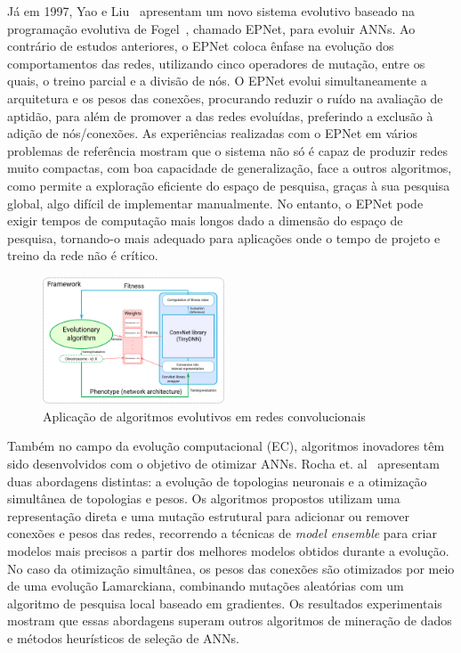 \documentclass[conference]{IEEEtran}
\begin{document}
Já em 1997, Yao e Liu~\cite{Yao1997ANetworks} apresentam um novo sistema evolutivo baseado na programação evolutiva de Fogel~\cite{Fogel1990EvolvingNetworks}, chamado EPNet, para evoluir ANNs. Ao contrário de estudos anteriores, o EPNet coloca ênfase na evolução dos comportamentos das redes, utilizando cinco operadores de mutação, entre os quais, o treino parcial e a divisão de nós. O EPNet evolui simultaneamente a arquitetura e os pesos das conexões, procurando reduzir o ruído na avaliação de aptidão, para além de promover a  das redes evoluídas, preferindo a exclusão à adição de nós/conexões. As experiências realizadas com o EPNet em vários problemas de referência mostram que o sistema não só é capaz de produzir redes muito compactas, com boa capacidade de generalização, face a outros algoritmos, como permite a exploração eficiente do espaço de pesquisa, graças à sua pesquisa global, algo difícil de implementar manualmente. No entanto, o EPNet pode exigir tempos de computação mais longos dado a dimensão do espaço de pesquisa, tornando-o mais adequado para aplicações onde o tempo de projeto e treino da rede não é crítico.

\begin{figure}[htbp]
    \centering
    \includegraphics[width=0.48\textwidth]{imagens/evo_alg3.png}
    \caption{Aplicação de algoritmos evolutivos em redes convolucionais\cite{Badan2019EvolutionaryDesign}}
    \label{fig:evo_alg_cnn}
\end{figure}

Também no campo da evolução computacional (EC), algoritmos inovadores têm sido desenvolvidos com o objetivo de otimizar ANNs. Rocha et. al~\cite{Rocha2007EvolutionRegression} apresentam duas abordagens distintas: a evolução de topologias neuronais e a otimização simultânea de topologias e pesos. Os algoritmos propostos utilizam uma representação direta e uma mutação estrutural para adicionar ou remover conexões e pesos das redes, recorrendo a técnicas de \textit{model ensemble} para criar modelos mais precisos a partir dos melhores modelos obtidos durante a evolução. No caso da otimização simultânea, os pesos das conexões são otimizados por meio de uma evolução Lamarckiana, combinando mutações aleatórias com um algoritmo de pesquisa local baseado em gradientes. Os resultados experimentais mostram que essas abordagens superam outros algoritmos de mineração de dados e métodos heurísticos de seleção de ANNs.
\end{document}
